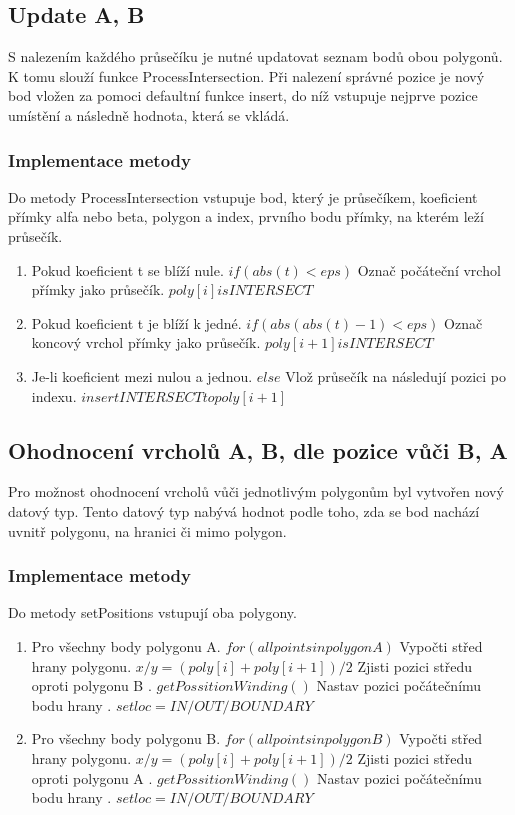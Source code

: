 \documentclass[a4paper, 12pt]{article}
\begin{document}
\subsection{Update A, B}
S nalezením každého průsečíku je nutné updatovat seznam bodů obou polygonů. K tomu slouží funkce ProcessIntersection. Při nalezení správné pozice je nový bod vložen za pomoci defaultní funkce insert, do níž vstupuje nejprve pozice umístění a následně hodnota, která se vkládá.

\subsubsection{Implementace metody}
Do metody ProcessIntersection vstupuje bod, který je průsečíkem, koeficient přímky alfa nebo beta, polygon a index, prvního bodu přímky, na kterém leží průsečík.


\begin{enumerate}
\item Pokud koeficient t se blíží nule. $ if( abs(t) < eps )$
\subitem Označ počáteční vrchol přímky jako průsečík. $ poly[i] is INTERSECT $
\item Pokud koeficient t je blíží k jedné. $if( abs(abs(t)-1) < eps ) $
\subitem Označ koncový vrchol přímky jako průsečík. $ poly[i+1] is INTERSECT $
\item Je-li koeficient mezi nulou a jednou. $ else $
\subitem Vlož průsečík na následují pozici po indexu. $ insert INTERSECT to poly[i+1] $
\end{enumerate}

\subsection{Ohodnocení vrcholů A, B, dle pozice vůči B, A}
Pro možnost ohodnocení vrcholů vůči jednotlivým polygonům byl vytvořen nový datový typ. Tento datový typ nabývá hodnot podle toho, zda se bod nachází uvnitř polygonu, na hranici či mimo polygon. 

\subsubsection{Implementace metody}
Do metody setPositions vstupují oba polygony.

\begin{enumerate}
\item Pro všechny body polygonu A. $ for( all points in polygon A ) $
\subitem Vypočti střed hrany polygonu. $ x/y = (poly[i] + poly[i+1])/2 $
\subitem Zjisti pozici středu oproti polygonu B . $ getPossitionWinding() $
\subitem Nastav pozici počátečnímu bodu hrany . $ set loc = IN/OUT/BOUNDARY $
\item Pro všechny body polygonu B. $ for( all points in polygon B ) $
\subitem Vypočti střed hrany polygonu. $ x/y = (poly[i] + poly[i+1])/2 $
\subitem Zjisti pozici středu oproti polygonu A . $ getPossitionWinding() $
\subitem Nastav pozici počátečnímu bodu hrany . $ set loc = IN/OUT/BOUNDARY $
\end{enumerate}
\end{document}
